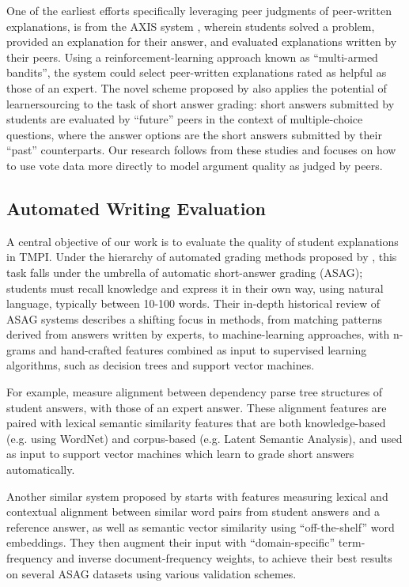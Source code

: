 \documentclass[notitlepage,12pt]{jedm}
\begin{document}
One of the earliest efforts specifically leveraging peer judgments of 
peer-written explanations, is from the AXIS system \cite{williams_axis:_2016}, 
wherein students solved a problem, provided an explanation for their answer, 
and evaluated explanations written by their peers.
Using a reinforcement-learning approach known as ``multi-armed bandits'', the 
system could select peer-written explanations rated as helpful 
as those of an expert.
The novel scheme proposed by  also applies the potential 
of learnersourcing to the task of short answer grading: short answers 
submitted by students are evaluated by ``future'' peers in the context of
multiple-choice questions, where the answer options are the short answers 
submitted by their ``past'' counterparts.
Our research follows from these studies and 
focuses on how to use vote data more directly to model argument 
quality as judged by peers.

\subsection{Automated Writing Evaluation}\label{sec:autom-writ-eval}

A central objective of our work is to evaluate the quality of student 
explanations in TMPI.
Under the hierarchy of automated grading methods proposed by  
, this task falls under the umbrella of automatic 
short-answer grading (ASAG); students must recall knowledge and express it 
in their own way, using natural language, typically between 10-100 words. 
Their in-depth historical review of ASAG systems describes a shifting focus in 
methods, from matching patterns derived from answers written by experts, to 
machine-learning approaches, with n-grams and hand-crafted features 
combined as input to supervised learning algorithms, such as decision trees and 
support vector machines.

For example,  measure alignment between dependency 
parse tree structures of student answers, with those of an expert answer.
These alignment features are paired with lexical semantic similarity features 
that are both knowledge-based (e.g. using WordNet) and corpus-based (e.g. 
Latent Semantic Analysis), and used as input to support vector machines which 
learn to grade short answers automatically.

Another similar system proposed by  starts with 
features measuring lexical and contextual alignment between similar word pairs 
from student answers and a reference answer, as well as semantic vector 
similarity using ``off-the-shelf'' word embeddings.  
They then augment their input with  ``domain-specific'' term-frequency and 
inverse document-frequency weights, to achieve their best results on several 
ASAG datasets using various validation schemes.
 
\end{document}
